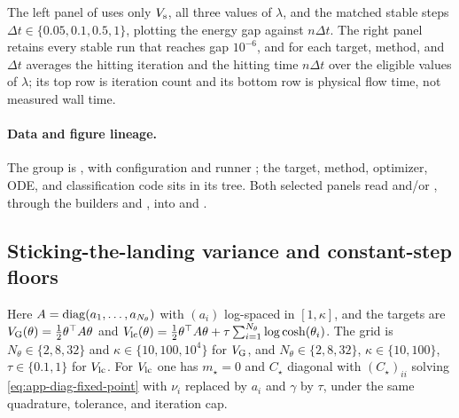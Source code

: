 The left panel of  uses only $V_{\rm s}$, all three
values of $\lambda$, and the matched stable steps
$\Delta t\in\{0.05,0.1,0.5,1\}$, plotting the energy gap against $n\Delta t$.
The right panel retains every stable run that reaches gap $10^{-6}$, and for
each target, method, and $\Delta t$ averages the hitting iteration and the
hitting time $n\Delta t$ over the eligible values of $\lambda$; its top row is
iteration count and its bottom row is physical flow time, not measured wall
time.

\paragraph{Data and figure lineage.}
\begingroup\small\raggedright
The group is , with configuration
 and runner ; the target,
method, optimizer, ODE, and classification code sits in its  tree.
Both selected panels read
 and/or
, through the
builders 
and , into
 and
.
\par\endgroup

\subsection{Sticking-the-landing variance and constant-step floors}

Here $A = \operatorname{diag}(a_1,\ldots,a_{N_\theta})$ with $(a_i)$ log-spaced in
$[1,\kappa]$, and the targets are
$V_{\rm G}(\theta) = \frac12\theta^\top A\theta$ and
$V_{\rm lc}(\theta) = \frac12\theta^\top A\theta
+ \tau\sum_{i=1}^{N_\theta}\log\cosh(\theta_i)$. The grid is
$N_\theta\in\{2,8,32\}$ and $\kappa\in\{10,100,10^4\}$ for $V_{\rm G}$, and
$N_\theta\in\{2,8,32\}$, $\kappa\in\{10,100\}$, $\tau\in\{0.1,1\}$ for
$V_{\rm lc}$. For $V_{\rm lc}$ one has $m_\star = 0$ and $C_\star$ diagonal with
$(C_\star)_{ii}$ solving \eqref{eq:app-diag-fixed-point} with $\nu_i$ replaced
by $a_i$ and $\gamma$ by $\tau$, under the same quadrature, tolerance, and
iteration cap.

